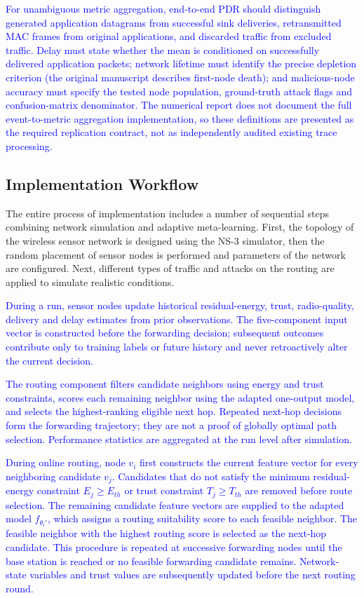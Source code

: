 \documentclass[pdflatex,sn-mathphys-num]{sn-jnl}
\newcommand{\Revised}[1]{\textcolor{blue}{#1}}
\begin{document}
\Revised{For unambiguous metric aggregation, end-to-end PDR should distinguish generated application datagrams from successful sink deliveries, retransmitted MAC frames from original applications, and discarded traffic from excluded traffic. Delay must state whether the mean is conditioned on successfully delivered application packets; network lifetime must identify the precise depletion criterion (the original manuscript describes first-node death); and malicious-node accuracy must specify the tested node population, ground-truth attack flags and confusion-matrix denominator. The numerical report does not document the full event-to-metric aggregation implementation, so these definitions are presented as the required replication contract, not as independently audited existing trace processing.}\par

\subsection{Implementation Workflow}

The entire process of implementation includes a number of sequential steps combining network simulation and adaptive meta-learning. First, the topology of the wireless sensor network is designed using the NS-3 simulator, then the random placement of sensor nodes is performed and parameters of the network are configured. Next, different types of traffic and attacks on the routing are applied to simulate realistic conditions.

\Revised{During a run, sensor nodes update historical residual-energy, trust, radio-quality, delivery and delay estimates from prior observations. The five-component input vector is constructed before the forwarding decision; subsequent outcomes contribute only to training labels or future history and never retroactively alter the current decision.}

\Revised{The routing component filters candidate neighbors using energy and trust constraints, scores each remaining neighbor using the adapted one-output model, and selects the highest-ranking eligible next hop. Repeated next-hop decisions form the forwarding trajectory; they are not a proof of globally optimal path selection. Performance statistics are aggregated at the run level after simulation.}

\textcolor{blue}{During online routing, node $v_i$ first constructs the current feature vector for every neighboring candidate $v_j$. Candidates that do not satisfy the minimum residual-energy constraint $E_j \geq E_{th}$ or trust constraint $T_j \geq T_{th}$ are removed before route selection. The remaining candidate feature vectors are supplied to the adapted model $f_{\theta_i'}$, which assigns a routing suitability score to each feasible neighbor. The feasible neighbor with the highest routing score is selected as the next-hop candidate. This procedure is repeated at successive forwarding nodes until the base station is reached or no feasible forwarding candidate remains. Network-state variables and trust values are subsequently updated before the next routing round.}
\end{document}
